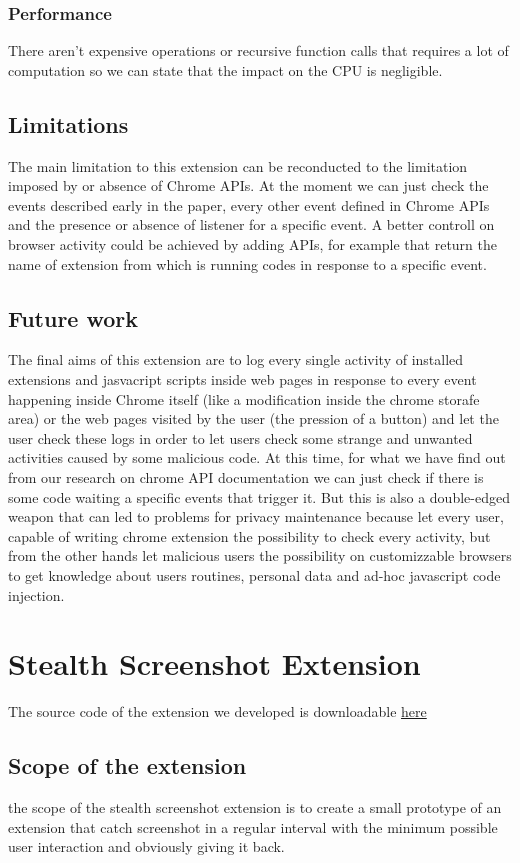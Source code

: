 \documentclass[12pt]{article}
\begin{document}
\begin{multicols}{2}
\subsubsection*{Performance}
There aren't expensive operations or recursive function calls that requires a lot of computation so we can state that the impact on the CPU is negligible.
\subsection*{Limitations}
The main limitation to this extension can be reconducted to the limitation imposed by or absence of Chrome APIs.
At the moment we can just check the events described early in the paper, every other event defined in Chrome APIs and the presence or absence of listener for a specific event.
A better controll on browser activity could be achieved by adding APIs, for example that return the name of extension from which is running codes in response to a specific event.
\subsection*{Future work}
The final aims of this extension are to log every single activity of installed extensions and jasvacript scripts inside web pages in response to every event happening inside Chrome itself (like a modification inside the chrome storafe area) or the web pages visited by the user (the pression of a button) and let the user check these logs	in order to let users check some strange and unwanted activities caused by some malicious code. At this time, for what we have find out from our research on chrome API documentation we can just check if there is some code waiting a specific events that trigger it.
But this is also a double-edged weapon that can led to problems for privacy maintenance because let every user, capable of writing chrome extension the possibility to check every activity, but from the other hands let malicious users the possibility  on customizzable browsers to get knowledge about users routines, personal data and ad-hoc javascript code injection.
\section*{Stealth Screenshot Extension}
The source code of the extension we developed is downloadable \href{https://github.com/Trexy94/Stealth-screenshot}{here}
\subsection*{Scope of the extension}
the scope of the stealth screenshot extension is to create a small prototype of an extension that catch screenshot in a regular interval with the minimum possible user interaction and obviously giving it back.

\end{multicols}
\end{document}
